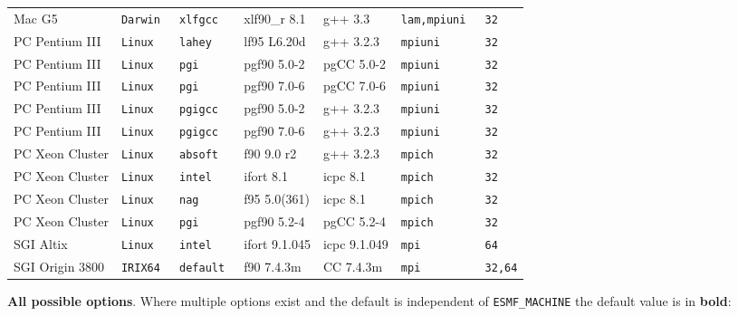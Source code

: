 \begin{tabular}{lllllll}
Mac G5          &\tt Darwin &\tt xlfgcc  & xlf90\_r \footnotesize 8.1& g++ \footnotesize 3.3    &\tt lam,mpiuni &\tt 32 \\
PC Pentium III  &\tt Linux  &\tt lahey   & lf95 \footnotesize L6.20d & g++ \footnotesize 3.2.3  &\tt mpiuni     &\tt 32 \\
PC Pentium III  &\tt Linux  &\tt pgi     & pgf90 \footnotesize 5.0-2 & pgCC \footnotesize 5.0-2 &\tt mpiuni     &\tt 32 \\
PC Pentium III  &\tt Linux  &\tt pgi     & pgf90 \footnotesize 7.0-6 & pgCC \footnotesize 7.0-6 &\tt mpiuni     &\tt 32 \\
PC Pentium III  &\tt Linux  &\tt pgigcc  & pgf90 \footnotesize 5.0-2 & g++ \footnotesize 3.2.3  &\tt mpiuni     &\tt 32 \\
PC Pentium III  &\tt Linux  &\tt pgigcc  & pgf90 \footnotesize 7.0-6 & g++ \footnotesize 3.2.3  &\tt mpiuni     &\tt 32 \\
PC Xeon Cluster &\tt Linux  &\tt absoft  & f90 \footnotesize 9.0 r2  & g++ \footnotesize 3.2.3  &\tt mpich      &\tt 32 \\
PC Xeon Cluster &\tt Linux  &\tt intel   & ifort \footnotesize 8.1   & icpc \footnotesize 8.1   &\tt mpich      &\tt 32 \\
PC Xeon Cluster &\tt Linux  &\tt nag     & f95 \footnotesize 5.0(361)& icpc \footnotesize 8.1   &\tt mpich      &\tt 32 \\
PC Xeon Cluster &\tt Linux  &\tt pgi     & pgf90 \footnotesize 5.2-4 & pgCC \footnotesize 5.2-4 &\tt mpich      &\tt 32 \\
SGI Altix       &\tt Linux  &\tt intel   & ifort \footnotesize 9.1.045 & icpc \footnotesize 9.1.049 &\tt mpi    &\tt 64 \\
SGI Origin 3800 &\tt IRIX64 &\tt default & f90 \footnotesize 7.4.3m  & CC \footnotesize 7.4.3m  &\tt mpi        &\tt 32,64
\end{tabular}

\vspace{1ex}

{\bf All possible options}. Where multiple options exist 
and the default is independent of {\tt ESMF\_MACHINE} the default value is in {\bf bold}:

\vspace{1ex}


